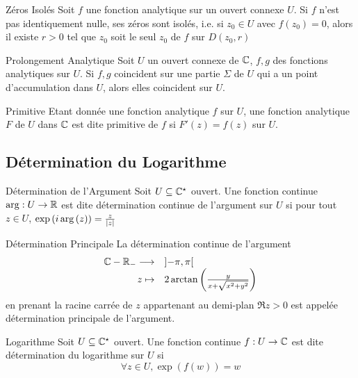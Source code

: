 \documentclass{cours}
\begin{document}
\begin{propositionfr}{Zéros Isolés}
    Soit $f$ une fonction analytique sur un ouvert connexe $U$. Si $f$ n'est pas identiquement nulle, ses zéros sont isolés, i.e. si $z_{0} \in U$ avec $f\left(z_{0}\right) = 0$, alors il existe $r > 0$ tel que $z_{0}$ soit le seul $z_{0}$ de $f$ sur $D\left(z_{0}, r\right)$
\end{propositionfr}

\begin{théorème}{Prolongement Analytique}{}
    Soit $U$ un ouvert connexe de $\mathbb{C}$, $f, g$ des fonctions analytiques sur $U$. Si $f, g$ coincident sur une partie $\Sigma$ de $U$ qui a un point d'accumulation dans $U$, alors elles coincident sur $U$. 
\end{théorème}

\begin{définition}{Primitive}{}
    Etant donnée une fonction analytique $f$ sur $U$, une fonction analytique $F$ de $U$ dans $\mathbb{C}$ est dite primitive de $f$ si $F'\left(z\right) = f\left(z\right)$ sur $U$. 
\end{définition}

\subsection{Détermination du Logarithme}
\begin{définition}{Détermination de l'Argument}{}
    Soit $U \subseteq \mathbb{C}^{\star}$ ouvert. Une fonction continue $\arg : U \to \mathbb{R}$ est dite détermination continue de l'argument sur $U$ si pour tout $z \in U$, $\exp\left(i\arg\left(z\right)\right)=\frac{z}{\left|z\right|}$
\end{définition}
\begin{définition}{Détermination Principale}{}
    La détermination continue de l'argument 
    \begin{equation*}
        \begin{array}{rl}
            \mathbb{C} - \mathbb{R}_{-} \longrightarrow & \left] - \pi, \pi \right[\\
            z \mapsto & 2\arctan\left(\frac{y}{x + \sqrt{x^{2} + y^{2}}}\right)
        \end{array}
    \end{equation*}
    en prenant la racine carrée de $z$ appartenant au demi-plan $\Re z > 0$ est appelée détermination principale de l'argument.
\end{définition}
\begin{définition}{Logarithme}{}
    Soit $U \subseteq \mathbb{C}^{\star}$ ouvert. Une fonction continue $f : U \to \mathbb{C}$ est dite détermination du logarithme sur $U$ si 
    \begin{equation*}
        \forall z \in U, \exp\left(f\left(w\right)\right) = w
    \end{equation*}
\end{définition}
\end{document}
